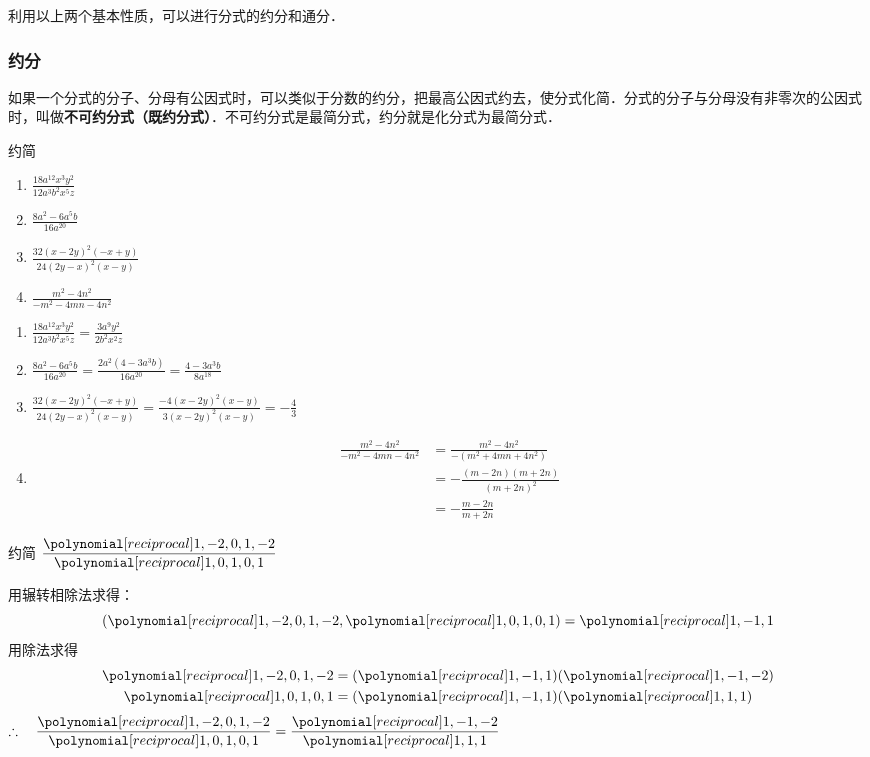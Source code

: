 利用以上两个基本性质，可以进行分式的约分和通分．

\subsubsection{约分}

如果一个分式的分子、分母有公因式时，可以类似于分数的约分，把最高公因式约去，使分式化简．分式的分子与分母没有非零次的公因式时，叫做\textbf{不可约分式（既约分式）}．不可约分式是最简分式，约分就是化分式为最简分式．

\begin{example}
    约简
\begin{enumerate}
    \item $\frac{18 a^{12} x^{3} y^{2}}{12 a^{3} b^{2} x^{5} z}$
    \item $\frac{8 a^{2}-6 a^{5} b}{16 a^{20}}$
    \item $\frac{32(x-2 y)^{2}(-x+y)}{24(2 y-x)^{2}(x-y)}$
    \item $\frac{m^{2}-4 n^{2}}{-m^{2}-4 m n-4 n^{2}}$
\end{enumerate}
\end{example}

\begin{solution}
\begin{enumerate}
    \item $\frac{18 a^{12} x^{3} y^{2}}{12 a^{3} b^{2} x^{5} z}=\frac{3 a^{9} y^{2}}{2 b^{2} x^{2} z}$
    \item $\frac{8 a^{2}-6 a^{5} b}{16 a^{20}}  =\frac{2 a^{2}\left(4-3 a^{3} b\right)}{16 a^{20}} = \frac{4-3 a^{3} b}{8 a^{18}} $
    \item $ \frac{32(x-2 y)^{2}(-x+y)}{24(2 y-x)^{2}(x-y)}  =\frac{-4(x-2 y)^{2}(x-y)}{3(x-2 y)^{2}(x-y)}=-\frac{4}{3}$
    \item \[\begin{split}
        \frac{m^{2}-4 n^{2}}{-m^{2}-4 m n-4 n^{2}} &=
    \frac{m^{2}-4 n^{2}}{-\left(m^{2}+4 m n+4 n^{2}\right)}\\&=-\frac{(m-2n)(m+2n)}{(m+2n)^2}\\&=-\frac{m-2n}{m+2n}
    \end{split} \]
\end{enumerate}
\end{solution}

\begin{example}
    约简 $\frac{\poly{1,-2,0,1,-2}}{\poly{1,0,1,0,1}}$
\end{example}

\begin{solution}
    用辗转相除法求得：
\[(\poly{1,-2,0,1,-2}, \poly{1,0,1,0,1})=\poly{1,-1,1}\]
用除法求得
\[\begin{split}
    \poly{1,-2,0,1,-2}&=(\poly{1,-1,1})(\poly{1,-1,-2})\\
    \poly{1,0,1,0,1}&=(\poly{1,-1,1})(\poly{1,1,1})
\end{split}\]
$\therefore\quad \frac{\poly{1,-2,0,1,-2}}{\poly{1,0,1,0,1}}=\frac{\poly{1,-1,-2}}{\poly{1,1,1}}$
\end{solution}

